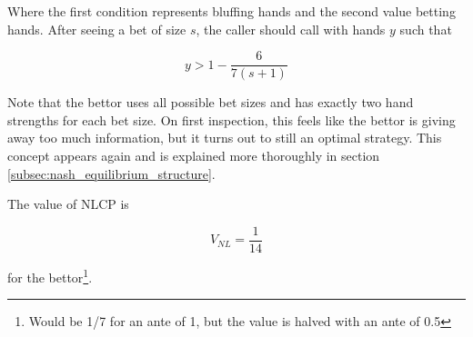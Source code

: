 \documentclass[../../main/main.tex]{subfiles}
\begin{document}
Where the first condition represents bluffing hands and the second value betting hands. After seeing a bet of size $s$, the caller should call with hands $y$ such that

$$ y > 1 - \frac{6}{7 (s+1)} $$

Note that the bettor uses all possible bet sizes and has exactly two hand strengths for each bet size. On first inspection, this feels like the bettor is giving away too much information, but it turns out to still an optimal strategy. This concept appears again and is explained more thoroughly in section \ref{subsec:nash_equilibrium_structure}.

The value of NLCP is

$$ V_{NL} = \frac{1}{14} $$

for the bettor\footnote{Would be 1/7 for an ante of 1, but the value is halved with an ante of 0.5}.
\end{document}

